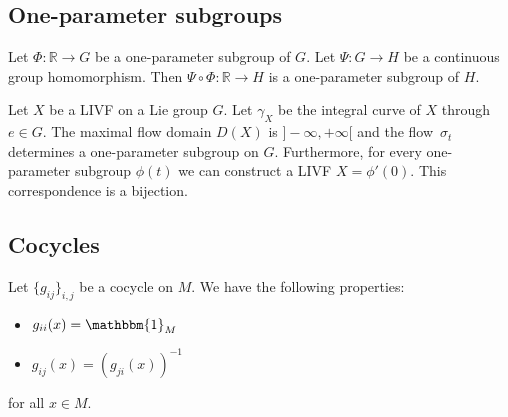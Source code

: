 \subsection{One-parameter subgroups}

        \begin{property}
        	\label{group:OPS_composition}
        	Let $\Phi:\mathbb{R}\rightarrow G$ be a one-parameter subgroup of $G$. Let $\Psi:G\rightarrow H$ be a continuous group homomorphism. Then $\Psi\circ\Phi:\mathbb{R}\rightarrow H$ is a one-parameter subgroup of $H$.
        \end{property}
        
        \begin{property}
        	Let $X$ be a LIVF on a Lie group $G$. Let $\gamma_X$ be the integral curve of $X$ through $e\in G$. The maximal flow domain $D(X)$ is $]-\infty, +\infty[$ and the flow\footnotemark\ $\sigma_t$ determines a one-parameter subgroup on $G$. Furthermore, for every one-parameter subgroup $\phi(t)$ we can construct a LIVF $X = \phi'(0)$. This correspondence is a bijection.
        \end{property}

\subsection{Cocycles}
	\begin{property}
		Let $\{g_{ij}\}_{i,j}$ be a cocycle on $M$. We have the following properties:
		\begin{itemize}
			\item $g_{ii}(x) = \mathbbm{1}_M$
			\item $g_{ij}(x) = (g_{ji}(x))^{-1}$
		\end{itemize}
		for all $x\in M$.
	\end{property}


